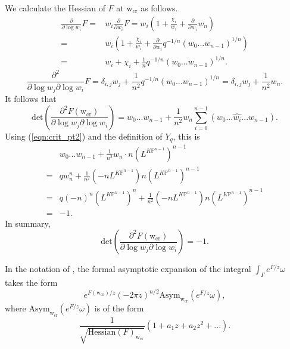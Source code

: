\documentclass[12pt]{amsart}
\numberwithin{equation}{section}
\newcommand{\KP}{K\mathbb{P}}
\begin{document}
We calculate the Hessian of $F$ at $\mathrm{w}_{\text{cr}}$ as follows. 
\begin{equation*}
\begin{split}
\frac{\partial}{\partial \log w_i} F=&w_i\frac{\partial}{\partial w_i} F=w_i\left(1+\frac{\chi_i}{w_i}+\frac{\partial}{\partial w_i} w_n \right)\\
=&w_i\left(1+\frac{\chi_i}{w_i}+\frac{\partial}{\partial w_i} q^{-1/n}(w_0...w_{n-1})^{1/n} \right)\\
=&w_i+\chi_i+\frac{1}{n}q^{-1/n}(w_0...w_{n-1})^{1/n}. 
\end{split}
\end{equation*}
\begin{equation*}
\frac{\partial^2}{\partial \log w_j\partial \log w_i} F=\delta_{i,j}w_j+\frac{1}{n^2}q^{-1/n}(w_0...w_{n-1})^{1/n}=\delta_{i,j}w_j+\frac{1}{n^2}w_n.
\end{equation*}
It follows that
\begin{equation*}
\text{det}\left(\frac{\partial^2 F(\mathrm{w}_{\text{cr}})}{\partial \log w_j\partial \log w_i} \right)= w_0...w_{n-1}+\frac{1}{n^2}w_n\sum_{i=0}^{n-1}(w_0...\widehat{w_i}...w_{n-1}).
\end{equation*}
Using (\ref{eqn:crit_pt2}) and the definition of $Y_q$, this is 
\begin{equation*}
\begin{split}
&w_0...w_{n-1}+\frac{1}{n^2}w_n \cdot n(L^{\KP^{n-1}})^{n-1}\\
=&qw_n^n +\frac{1}{n^2}(-nL^{\KP^{n-1}})n(L^{\KP^{n-1}})^{n-1}\\
=&q(-n)^n(L^{\KP^{n-1}})^n+\frac{1}{n^2}(-nL^{\KP^{n-1}})n(L^{\KP^{n-1}})^{n-1}\\
=&-1.
\end{split}
\end{equation*}
In summary, 
\begin{equation}
\text{det}\left(\frac{\partial^2 F(\mathrm{w}_{\text{cr}})}{\partial \log w_j\partial \log w_i} \right)=-1.
\end{equation}

In the notation of \cite[Section 6.2]{ccit_toric3}, the formal asymptotic expansion of the integral $\int_\Gamma e^{F/z}\omega$ takes the form
\begin{equation}
e^{F(\mathrm{w}_{\text{cr}})/z}(-2\pi z)^{n/2}\text{Asym}_{\mathrm{w}_{\text{cr}}}(e^{F/z}\omega),    
\end{equation}
where $\text{Asym}_{\mathrm{w}_{\text{cr}}}(e^{F/z}\omega)$ is of the form
\begin{equation}
\frac{1}{\sqrt{\text{Hessian}(F)_{\mathrm{w}_{\text{cr}}}}}(1+a_1z+a_2z^2+...).    
\end{equation}
\end{document}
